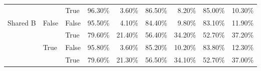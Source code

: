 \begin{table}[h]
\begin{tabular}{lllrrrrrr}
 &  & True & 96.30\% & 3.60\% & 86.50\% & 8.20\% & 85.00\% & 10.30\% \\
\cline{1-9} \cline{2-9}
\multirow[t]{4}{*}{Shared B} & \multirow[t]{2}{*}{False} & False & 95.50\% & 4.10\% & 84.40\% & 9.80\% & 83.10\% & 11.90\% \\
 &  & True & 79.60\% & 21.40\% & 56.40\% & 34.20\% & 52.70\% & 37.20\% \\
\cline{2-9}
 & \multirow[t]{2}{*}{True} & False & 95.80\% & 3.60\% & 85.20\% & 10.20\% & 83.80\% & 12.30\% \\
 &  & True & 79.60\% & 21.30\% & 56.50\% & 34.10\% & 52.70\% & 37.00\% \\
\cline{1-9} \cline{2-9}
\bottomrule
\end{tabular}
\end{table}
